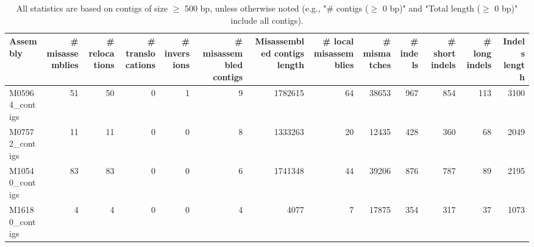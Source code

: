 \documentclass[12pt,a4paper]{article}
\begin{document}
\begin{table}[ht]
\begin{center}
\caption{All statistics are based on contigs of size $\geq$ 500 bp, unless otherwise noted (e.g., "\# contigs ($\geq$ 0 bp)" and "Total length ($\geq$ 0 bp)" include all contigs).}
\begin{tabular}{|l*{12}{|r}|}
\hline
Assembly & \# misassemblies &     \# relocations &     \# translocations &     \# inversions & \# misassembled contigs & Misassembled contigs length & \# local misassemblies & \# mismatches & \# indels &     \# short indels &     \# long indels & Indels length \\ \hline
M05964\_contigs & 51 & 50 & 0 & 1 & 9 & 1782615 & 64 & 38653 & 967 & 854 & 113 & 3100 \\ \hline
M07572\_contigs & 11 & 11 & 0 & 0 & 8 & 1333263 & 20 & 12435 & 428 & 360 & 68 & 2049 \\ \hline
M10540\_contigs & 83 & 83 & 0 & 0 & 6 & 1741348 & 44 & 39206 & 876 & 787 & 89 & 2195 \\ \hline
M16180\_contigs & 4 & 4 & 0 & 0 & 4 & 4077 & 7 & 17875 & 354 & 317 & 37 & 1073 \\ \hline
\end{tabular}
\end{center}
\end{table}
\end{document}

